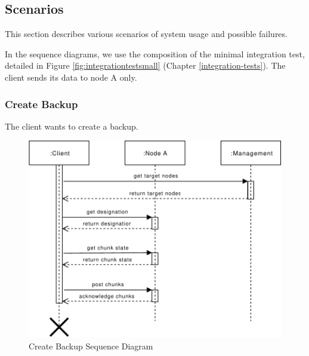 \subsection{Scenarios}
\label{sec:scenarios}
This section describes various scenarios of system usage and possible failures.

In the sequence diagrams, we use the composition of the minimal integration test, detailed in Figure \ref{fig:integrationtestsmall} (Chapter \ref{integration-tests}).
The \gls{client} sends its data to \Gls{node} A only.

\subsubsection{Create Backup}\label{sec:scenario-create-backup}
The \gls{client} wants to create a backup.

\begin{figure}[h]
    \centering
    \includegraphics[width=\linewidth]{resources/create_backup}
    \caption{Create Backup Sequence Diagram}
    \label{fig:create-backup}
\end{figure}

